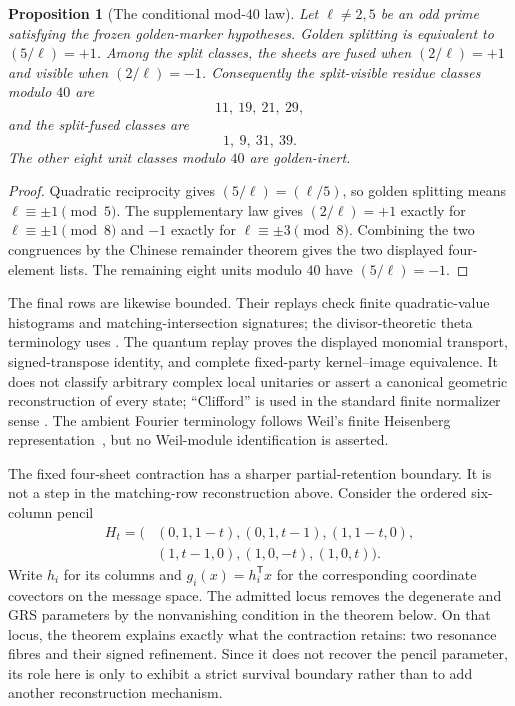 \documentclass[11pt]{article}
\newtheorem{proposition}[theorem]{Proposition}
\theoremstyle{definition}
\theoremstyle{remark}
\begin{document}
\begin{proposition}[The conditional mod-$40$ law]
\label{prop:mod40-reciprocity}
Let $\ell\ne2,5$ be an odd prime satisfying the frozen golden-marker
hypotheses.  Golden splitting is equivalent to
$(5/\ell)=+1$.  Among the split classes, the sheets are fused when
$(2/\ell)=+1$ and visible when $(2/\ell)=-1$.  Consequently the
split-visible residue classes modulo $40$ are
\[
  11,\ 19,\ 21,\ 29,
\]
and the split-fused classes are
\[
  1,\ 9,\ 31,\ 39.
\]
The other eight unit classes modulo $40$ are golden-inert.
\end{proposition}

\begin{proof}
Quadratic reciprocity gives $(5/\ell)=(\ell/5)$, so golden splitting means
$\ell\equiv\pm1\pmod5$.  The supplementary law gives
$(2/\ell)=+1$ exactly for $\ell\equiv\pm1\pmod8$ and $-1$ exactly for
$\ell\equiv\pm3\pmod8$.  Combining the two congruences by the Chinese
remainder theorem gives the two displayed four-element lists.  The
remaining eight units modulo $40$ have $(5/\ell)=-1$.
\end{proof}

The final rows are likewise bounded.  Their replays check finite
quadratic-value histograms and matching-intersection signatures; the
divisor-theoretic theta terminology uses
\cite[Prop.~6.1, pp.~95--97]{MumfordThetaII}.  The quantum replay proves the
displayed monomial transport,
signed-transpose identity, and complete fixed-party kernel--image
equivalence.  It does not classify arbitrary complex local unitaries or
assert a canonical geometric reconstruction of every state; ``Clifford''
is used in the standard finite normalizer sense
\cite[Chs.~6--7]{NebeRainsSloane2006}.  The ambient Fourier terminology
follows Weil's finite Heisenberg representation~\cite{Weil1964}, but no
Weil-module identification is asserted.

The fixed four-sheet contraction has a sharper partial-retention boundary.
It is not a step in the matching-row reconstruction above.  Consider the
ordered six-column pencil
\[
\begin{aligned}
H_t=\bigl(& (0,1,1-t),(0,1,t-1),(1,1-t,0),\\
          & (1,t-1,0),(1,0,-t),(1,0,t)\bigr).
\end{aligned}
\]
Write \(h_i\) for its columns and \(g_i(x)=h_i^{\mathsf T}x\) for the corresponding
coordinate covectors on the message space.  The admitted locus removes the
degenerate and GRS parameters by the nonvanishing condition in the theorem
below.  On that locus, the theorem explains exactly what the contraction
retains: two resonance fibres and their signed refinement.  Since it does
not recover the pencil parameter, its role here is only to exhibit a
strict survival boundary rather than to add another reconstruction
mechanism.
\end{document}
